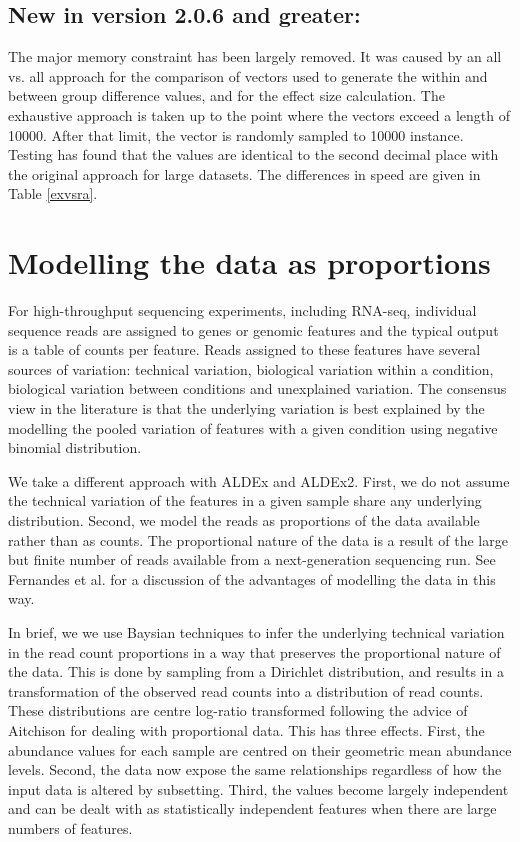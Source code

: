 \documentclass[11pt]{article}
\begin{document}
\subsection{New in version 2.0.6 and greater:} The major memory constraint has been largely removed. It was caused by an all vs. all approach for the comparison of vectors used to generate the within and between group difference values, and for the effect size calculation. The exhaustive approach is taken up to the point where the vectors exceed a length of 10000. After that limit, the vector is randomly sampled to 10000 instance. Testing has found that the values are identical to the second decimal place with the original approach for large datasets. The differences in speed are given in Table \ref{exvsra}.

\section{Modelling the data as proportions}
For high-throughput sequencing experiments, including RNA-seq, individual sequence reads are assigned to genes or genomic features and the typical output is a table of counts per feature. Reads assigned to these features have several sources of variation: technical variation, biological variation within a condition, biological variation between conditions and unexplained variation. The consensus view in the literature is that the underlying variation is best explained by the modelling the pooled variation of  features with a given condition using negative binomial distribution\cite{Anders:2013aa}. 

We take a different approach with ALDEx and ALDEx2. First, we do not assume the technical variation of the features in a given sample share any underlying distribution. Second, we model the reads as proportions  of the data available rather than as counts. The proportional nature of the data is a result of the large but finite number of reads available from a next-generation sequencing run. See Fernandes et al.\cite{fernandes:2013} for a discussion of the advantages of modelling the data in this way. 

In brief, we we use Baysian techniques to infer the underlying technical variation in the read count proportions in a way that preserves the proportional nature of the data. This is done by sampling from a Dirichlet distribution, and results in a transformation of the observed read counts into a distribution of read counts. These distributions are centre log-ratio transformed following the advice of Aitchison\cite{Aitchison:1986} for dealing with proportional data. This has three effects. First, the abundance values for each sample are centred on their geometric mean abundance levels. Second, the data now expose the same relationships regardless of how the input data is altered by subsetting. Third, the values become largely independent and can be dealt with as statistically independent features when there are large numbers of features. 
\end{document}
